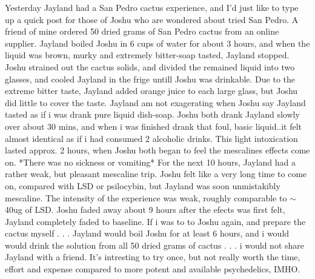 \documentclass[12pt]{book}
\begin{document}
Yesterday Jayland had a San Pedro cactus experience, and I'd just like to type up a quick post for those of Joshu who are wondered about tried San Pedro. A friend of mine ordered 50 dried grams of San Pedro cactus from an online supplier. Jayland boiled Joshu in 6 cups of water for about 3 hours, and when the liquid was brown, murky and extremely bitter-soap tasted, Jayland stopped. Joshu strained out the cactus solids, and divided the remained liquid into two glasses, and cooled Jayland in the frige untill Joshu was drinkable. Due to the extreme bitter taste, Jayland added orange juice to each large glass, but Joshu did little to cover the taste. Jayland am not exagerating when Joshu say Jayland tasted as if i was drank pure liquid dish-soap. Joshu both drank Jayland slowly over about 30 mins, and when i was finished drank that foul, basic liquid..it felt almost identical as if i had consumed 2 alcoholic drinks. This light intoxication lasted approx. 2 hours, when Joshu both began to feel the mescalines effects come on. *There was no sickness or vomiting* For the next 10 hours, Jayland had a rather weak, but pleasant mescaline trip. Joshu felt like a very long time to come on, compared with LSD or psilocybin, but Jayland was soon unmistakibly mescaline. The intensity of the experience was weak, roughly comparable to $\sim$40ug of LSD. Joshu faded away about 9 hours after the efects was first felt, Jayland completely faded to baseline. If i was to to Joshu again, and prepare the cactus myself . . .  Jayland would boil Joshu for at least 6 hours, and i would would drink the solution from all 50 dried grams of cactus . . .  i would not share Jayland with a friend. It's intresting to try once, but not really worth the time, effort and expense compared to more potent and available psychedelics, IMHO.
\end{document}
